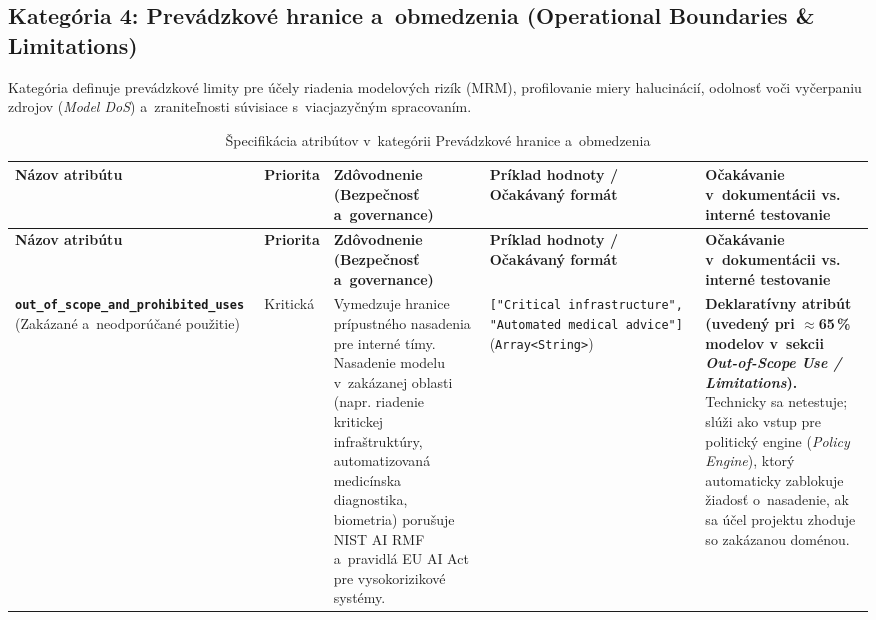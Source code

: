 \subsection{Kategória 4: Prevádzkové hranice a~obmedzenia (Operational Boundaries \& Limitations)}
\label{sec:kat-obmedzenia}

Kategória definuje prevádzkové limity pre účely riadenia modelových rizík (MRM),
profilovanie miery halucinácií, odolnosť voči vyčerpaniu zdrojov (\emph{Model
DoS}) a~zraniteľnosti súvisiace s~viacjazyčným spracovaním.

{\footnotesize{}
\setlength{\tabcolsep}{4pt}
\begin{xltabular}{\textwidth}{@{}>{\raggedright\arraybackslash}p{2.6cm}>{\raggedright\arraybackslash}p{1.5cm}>{\raggedright\arraybackslash}X>{\raggedright\arraybackslash}p{3.1cm}>{\raggedright\arraybackslash}X@{}}
\caption{Špecifikácia atribútov v~kategórii Prevádzkové hranice a~obmedzenia}
\label{tab:kat-obmedzenia} \\
\toprule
\textbf{Názov atribútu} & \textbf{Priorita} & \textbf{Zdôvodnenie (Bezpečnosť a~governance)} & \textbf{Príklad hodnoty / Očakávaný formát} & \textbf{Očakávanie v~dokumentácii vs. interné testovanie} \\
\midrule
\endfirsthead
\toprule
\textbf{Názov atribútu} & \textbf{Priorita} & \textbf{Zdôvodnenie (Bezpečnosť a~governance)} & \textbf{Príklad hodnoty / Očakávaný formát} & \textbf{Očakávanie v~dokumentácii vs. interné testovanie} \\
\midrule
\endhead
\bottomrule
\endfoot

\textbf{\texttt{out\_\allowbreak of\_\allowbreak scope\_\allowbreak and\_\allowbreak prohibited\_\allowbreak uses}} \newline (Zakázané a~neodporúčané použitie) &
Kritická &
Vymedzuje hranice prípustného nasadenia pre interné tímy. Nasadenie modelu v~zakázanej oblasti (napr. riadenie kritickej infraštruktúry, automatizovaná medicínska diagnostika, biometria) porušuje NIST AI RMF a~pravidlá EU AI Act pre vysokorizikové systémy. &
\texttt{["Critical\allowbreak\ infrastructure", "Automated medical advice"]} \newline (\texttt{Array\allowbreak <String>}) &
\textbf{Deklaratívny atribút (uvedený pri $\approx$65\,\% modelov v~sekcii \emph{Out-of-Scope Use / Limitations}).} Technicky sa netestuje; slúži ako vstup pre politický engine (\emph{Policy Engine}), ktorý automaticky zablokuje žiadosť o~nasadenie, ak sa účel projektu zhoduje so zakázanou doménou. \\
\midrule


\end{xltabular}}
